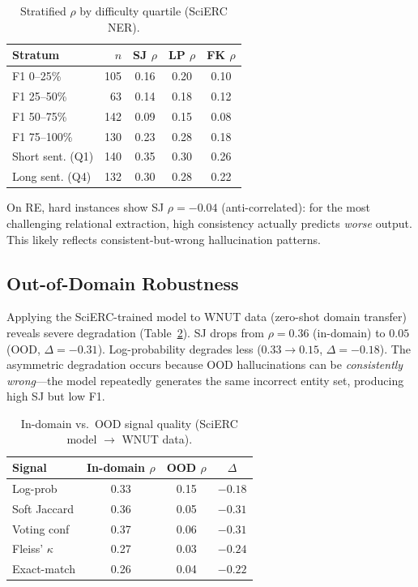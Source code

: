 \documentclass[11pt,a4paper]{article}
\begin{document}
\begin{table}[t]
\centering
\small
\caption{Stratified $\rho$ by difficulty quartile (SciERC NER).}
\label{tab:stratification}
\begin{tabular}{lrccc}
\toprule
Stratum & $n$ & SJ $\rho$ & LP $\rho$ & FK $\rho$ \\
\midrule
F1 0--25\% & 105 & 0.16 & 0.20 & 0.10 \\
F1 25--50\% & 63 & 0.14 & 0.18 & 0.12 \\
F1 50--75\% & 142 & 0.09 & 0.15 & 0.08 \\
F1 75--100\% & 130 & 0.23 & 0.28 & 0.18 \\
\midrule
Short sent. (Q1) & 140 & 0.35 & 0.30 & 0.26 \\
Long sent. (Q4) & 132 & 0.30 & 0.28 & 0.22 \\
\bottomrule
\end{tabular}
\end{table}

On RE, hard instances show SJ $\rho = -0.04$ (anti-correlated): for the most challenging relational extraction, high consistency actually predicts \emph{worse} output. This likely reflects consistent-but-wrong hallucination patterns.

\subsection{Out-of-Domain Robustness}
\label{sec:ood}

Applying the SciERC-trained model to WNUT data (zero-shot domain transfer) reveals severe degradation (Table~\ref{tab:ood}). SJ drops from $\rho = 0.36$ (in-domain) to $0.05$ (OOD, $\Delta = -0.31$). Log-probability degrades less ($0.33 \to 0.15$, $\Delta = -0.18$). The asymmetric degradation occurs because OOD hallucinations can be \emph{consistently wrong}---the model repeatedly generates the same incorrect entity set, producing high SJ but low F1.

\begin{table}[t]
\centering
\small
\caption{In-domain vs.\ OOD signal quality (SciERC model $\to$ WNUT data).}
\label{tab:ood}
\begin{tabular}{lccc}
\toprule
Signal & In-domain $\rho$ & OOD $\rho$ & $\Delta$ \\
\midrule
Log-prob & 0.33 & 0.15 & $-0.18$ \\
Soft Jaccard & 0.36 & 0.05 & $-0.31$ \\
Voting conf & 0.37 & 0.06 & $-0.31$ \\
Fleiss' $\kappa$ & 0.27 & 0.03 & $-0.24$ \\
Exact-match & 0.26 & 0.04 & $-0.22$ \\
\bottomrule
\end{tabular}
\end{table}
\end{document}
